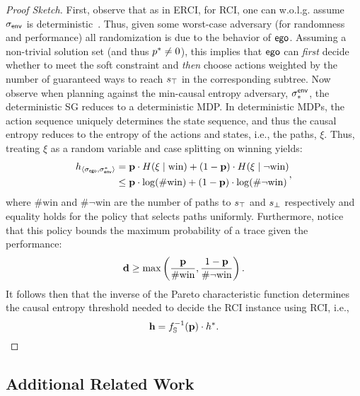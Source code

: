 \begin{proof}[Proof Sketch]
  First, observe that as in ERCI, for RCI, one can w.o.l.g. assume
  ${\sigma_{\mathsf{env}}}$ is deterministic~\cite{DBLP:conf/cav/FremontS18}.
  Thus, given some worst-case adversary (for randomness and
  performance) all randomization is due to the behavior of
  $\mathsf{ego}$. Assuming a non-trivial solution set (and thus
  $p^{*} \neq 0$), this implies that $\mathsf{ego}$ can \emph{first} decide
  whether to meet the soft constraint and \emph{then} choose actions
  weighted by the number of guaranteed ways to reach $s_{\top}$ in the
  corresponding subtree. Now observe when planning against the
  min-causal entropy adversary, $\sigma_*^{\mathsf{env}}$, the deterministic SG
  reduces to a deterministic MDP. In deterministic MDPs, the action
  sequence uniquely determines the state sequence, and thus the causal
  entropy reduces to the entropy of the actions and states, i.e., the
  paths, $\xi$.  Thus, treating $\xi$ as a random variable and
  case splitting on winning yields:
  \begin{equation}\label{eq:cond_win}
    \begin{split}
      h_{\langle \sched_\pOne, \sched^*_\pTwo\rangle} &= \scthreshold\cdot H(\xi \mid \text{win}) + (1 - \scthreshold)\cdot H(\xi \mid \neg \text{win})\\
      &\leq \scthreshold\cdot \log(\#\text{win}) + (1 - \scthreshold)\cdot \log(\#\neg
      \text{win})
    \end{split},
  \end{equation}
  where $\#\text{win}$ and $\#\neg \text{win}$ are the
  number of paths to $s_{\top}$ and $s_{\bot}$ respectively and equality holds
  for the policy that selects paths uniformly. Furthermore, notice that this policy
  bounds the maximum probability of a trace given the performance:
  \begin{equation}
    \mathbf{d} \geq \max\left(\frac{\mathbf{p}}{\#\text{win}}, \frac{ 1- \mathbf{p}}{\#\neg \text{win}}\right).
  \end{equation}
  It follows then that the inverse of the Pareto characteristic
  function determines the causal entropy threshold needed to decide the RCI instance
  using RCI, i.e.,
  \begin{equation}
    \mathbf{h} = f_\mathbb{S}^{-1}(\mathbf{p}) \cdot h^*.
  \end{equation}
\end{proof}

\subsection{Additional Related Work}\label{sec:related}
 
